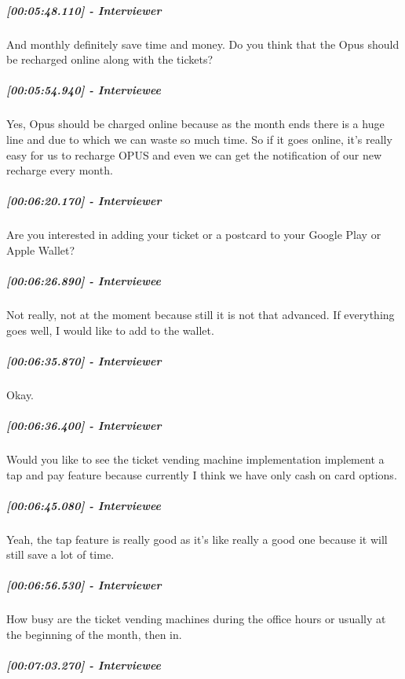 \documentclass[a4paper,12pt]{article}
\begin{document}
\hypertarget{interviewer-30}{%
\subparagraph{{[}00:05:48.110{]} - Interviewer}\label{interviewer-30}}

And monthly definitely save time and money. Do you think that the Opus
should be recharged online along with the tickets?

\hypertarget{interviewee-23}{%
\subparagraph{{[}00:05:54.940{]} - Interviewee}\label{interviewee-23}}

Yes, Opus should be charged online because as the month ends there is a
huge line and due to which we can waste so much time. So if it goes
online, it's really easy for us to recharge OPUS and even we can get the
notification of our new recharge every month.

\hypertarget{interviewer-31}{%
\subparagraph{{[}00:06:20.170{]} - Interviewer}\label{interviewer-31}}

Are you interested in adding your ticket or a postcard to your Google
Play or Apple Wallet?

\hypertarget{interviewee-24}{%
\subparagraph{{[}00:06:26.890{]} - Interviewee}\label{interviewee-24}}

Not really, not at the moment because still it is not that advanced. If
everything goes well, I would like to add to the wallet.

\hypertarget{interviewer-32}{%
\subparagraph{{[}00:06:35.870{]} - Interviewer}\label{interviewer-32}}

Okay.

\hypertarget{interviewer-33}{%
\subparagraph{{[}00:06:36.400{]} - Interviewer}\label{interviewer-33}}

Would you like to see the ticket vending machine implementation
implement a tap and pay feature because currently I think we have only
cash on card options.

\hypertarget{interviewee-25}{%
\subparagraph{{[}00:06:45.080{]} - Interviewee}\label{interviewee-25}}

Yeah, the tap feature is really good as it's like really a good one
because it will still save a lot of time.

\hypertarget{interviewer-34}{%
\subparagraph{{[}00:06:56.530{]} - Interviewer}\label{interviewer-34}}

How busy are the ticket vending machines during the office hours or
usually at the beginning of the month, then in.

\hypertarget{interviewee-26}{%
\subparagraph{{[}00:07:03.270{]} - Interviewee}\label{interviewee-26}}
\end{document}
